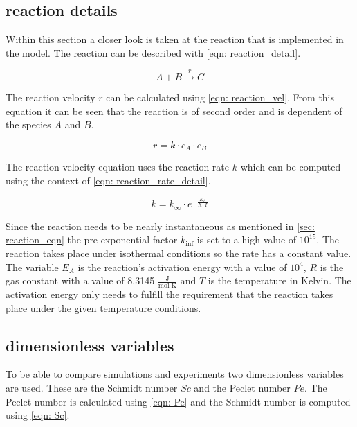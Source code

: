 \documentclass[../thesis.tex]{subfiles}
\begin{document}
\subsection{reaction details}

Within this section a closer look is taken at the reaction that is implemented in the model. The reaction can be described with \autoref{eqn: reaction_detail}.

\begin{equation}
	\label{eqn: reaction_detail}
	A + B \xrightarrow{r} C
\end{equation}

The reaction velocity $r$ can be calculated using \autoref{eqn: reaction_vel}. From this equation it can be seen that the reaction is of second order and is dependent of the species $A$ and $B$.

\begin{equation}
	\label{eqn: reaction_vel}
	r = k \cdot c_A \cdot c_B
\end{equation}

The reaction velocity equation uses the reaction rate $k$ which can be computed using the context of \autoref{eqn: reaction_rate_detail}.

\begin{equation}
	\label{eqn: reaction_rate_detail}
	k = k_{\infty} \cdot e^{- \frac{E_A}{R \cdot T}}
\end{equation}

Since the reaction needs to be nearly instantaneous as mentioned in \autoref{sec: reaction_eqn} the pre-exponential factor $k_{\inf}$ is set to a high value of $10^{15}$. The reaction takes place under isothermal conditions so the rate has a constant value. The variable $E_A$ is the reaction's activation energy with a value of $10^4$, $R$ is the gas constant with a value of 8.3145 $ \frac{\text{J}}{\text{mol} \cdot \text{K}}$ and $T$ is the temperature in Kelvin. The activation energy only needs to fulfill the requirement that the reaction takes place under the given temperature conditions.

\subsection{dimensionless variables}

To be able to compare simulations and experiments two dimensionless variables are used. These are the Schmidt number $Sc$ and the Peclet number $Pe$. The Peclet number is calculated using \autoref{eqn: Pe} and the Schmidt number is computed using \autoref{eqn: Sc}.
\end{document}
